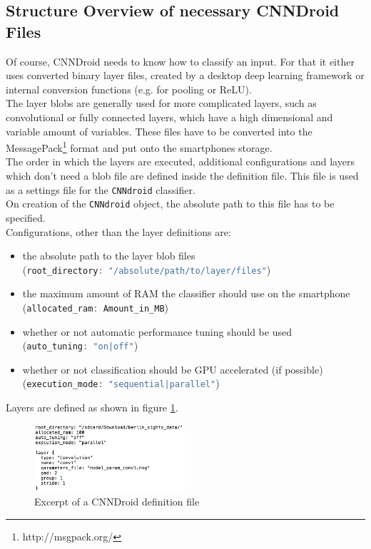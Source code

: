 \subsection{Structure Overview of necessary CNNDroid Files}
Of course, CNNDroid needs to know how to classify an input. For that it either uses converted binary layer files, created by a desktop deep learning framework or internal conversion functions (e.g. for pooling or ReLU).\\
The layer blobs are generally used for more complicated layers, such as convolutional or fully connected layers, which have a high dimensional and variable amount of variables. These files have to be converted into the MessagePack\footnote{http://msgpack.org/} format and put onto the smartphones storage.\\
The order in which the layers are executed, additional configurations and layers which don't need a blob file are defined inside the definition file. This file is used as a settings file for the \lstinline[language=Java]{CNNdroid} classifier.\\
On creation of the \lstinline[language=Java]{CNNdroid} object, the absolute path to this file has to be specified.\\
Configurations, other than the layer definitions are:
\begin{itemize}
    \item{the absolute path to the layer blob files\\(\lstinline[language=Java]{root_directory: "/absolute/path/to/layer/files"})}
    \item{the maximum amount of RAM the classifier should use on the smartphone\\(\lstinline[language=Java]{allocated_ram: Amount_in_MB})}
    \item{whether or not automatic performance tuning should be used\\(\lstinline[language=Java]{auto_tuning: "on|off"})}
    \item{whether or not classification should be GPU accelerated (if possible)\\(\lstinline[language=Java]{execution_mode: "sequential|parallel"})}
\end{itemize}
Layers are defined as shown in figure \ref{fig:def_file}.

\begin{figure}
  \centering
    \includegraphics[width=0.5\textwidth]{def_file.png}
  \caption{Excerpt of a CNNDroid definition file}
  \label{fig:def_file}
\end{figure}

